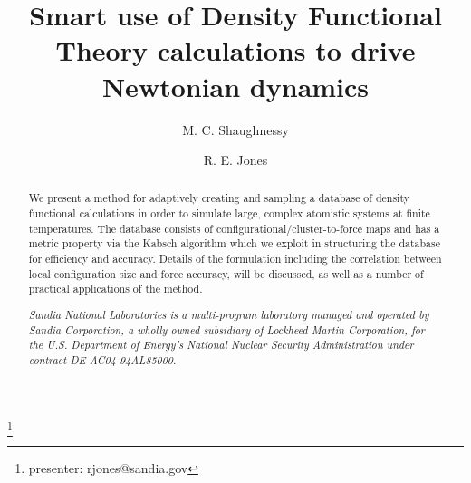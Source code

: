 \documentclass[12pt]{revtex4-1}
\begin{document}
\vskip 1.0in

\title{Smart use of Density Functional Theory calculations to drive Newtonian dynamics}
\author{M. C. Shaughnessy}
\author{R. E. Jones}\thanks{presenter: rjones@sandia.gov} 

\vskip 0.5in

\begin{abstract}


We present a method for adaptively creating and sampling a database of density functional calculations in order to simulate large, complex atomistic systems at finite temperatures. 
The database consists of configurational/cluster-to-force maps and has a metric property via the Kabsch algorithm which we exploit in structuring the database for efficiency and accuracy. 
Details of the formulation including the correlation between local configuration size and force accuracy, will be discussed, as well as a number of practical applications of the method.


\vskip 0.5in

\small
\it
Sandia National Laboratories is a multi-program laboratory managed and operated by Sandia Corporation, a wholly owned subsidiary of Lockheed Martin Corporation, for the U.S. Department of Energy's National Nuclear Security Administration under contract DE-AC04-94AL85000.

\end{abstract}

\maketitle
\end{document}
